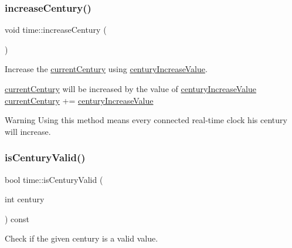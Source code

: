 \subsubsection{\texorpdfstring{increase\+Century()}{increaseCentury()}}
{\footnotesize\ttfamily void time\+::increase\+Century (\begin{DoxyParamCaption}{ }\end{DoxyParamCaption})\hspace{0.3cm}{\ttfamily [static]}}



Increase the \mbox{\hyperlink{classtime_acab6780ebb25862cb83316cb967b8b57}{current\+Century}} using \mbox{\hyperlink{classtime_af12b7ed0d7ff922e00ecb46dabdaede6}{century\+Increase\+Value}}. 

\mbox{\hyperlink{classtime_acab6780ebb25862cb83316cb967b8b57}{current\+Century}} will be increased by the value of \mbox{\hyperlink{classtime_af12b7ed0d7ff922e00ecb46dabdaede6}{century\+Increase\+Value}} ~\newline
 \mbox{\hyperlink{classtime_acab6780ebb25862cb83316cb967b8b57}{current\+Century}} += \mbox{\hyperlink{classtime_af12b7ed0d7ff922e00ecb46dabdaede6}{century\+Increase\+Value}} \begin{DoxyWarning}{Warning}
Using this method means every connected real-\/time clock his century will increase. 
\end{DoxyWarning}
\mbox{\label{classtime_a01413b7e5754345cf032cc7afa13efb0}} 
\subsubsection{\texorpdfstring{is\+Century\+Valid()}{isCenturyValid()}}
{\footnotesize\ttfamily bool time\+::is\+Century\+Valid (\begin{DoxyParamCaption}\item[{int}]{century }\end{DoxyParamCaption}) const}



Check if the given century is a valid value. 


